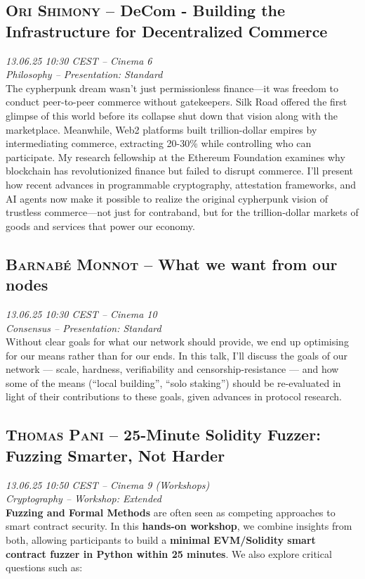 \subsection {\textsc{Ori Shimony}  -- DeCom - Building the Infrastructure for Decentralized Commerce} \noindent \textit {13.06.25 10:30 CEST -- Cinema 6\\ Philosophy -- Presentation: Standard}\\[1em] The cypherpunk dream wasn't just permissionless finance—it was freedom to conduct peer-to-peer commerce without gatekeepers. Silk Road offered the first glimpse of this world before its collapse shut down that vision along with the marketplace. Meanwhile, Web2 platforms built trillion-dollar empires by intermediating commerce, extracting 20-30\% while controlling who can participate. My research fellowship at the Ethereum Foundation examines why blockchain has revolutionized finance but failed to disrupt commerce. I'll present how recent advances in programmable cryptography, attestation frameworks, and AI agents now make it possible to realize the original cypherpunk vision of trustless commerce—not just for contraband, but for the trillion-dollar markets of goods and services that power our economy.

\clearpage
\subsection {\textsc{Barnabé Monnot}  -- What we want from our nodes} \noindent \textit {13.06.25 10:30 CEST -- Cinema 10\\ Consensus -- Presentation: Standard}\\[1em] Without clear goals for what our network should provide, we end up optimising for our means rather than for our ends. In this talk, I'll discuss the goals of our network — scale, hardness, verifiability and censorship-resistance — and how some of the means (``local building'', ``solo staking'') should be re-evaluated in light of their contributions to these goals, given advances in protocol research.

\clearpage
\subsection {\textsc{Thomas Pani}  -- 25-Minute Solidity Fuzzer: Fuzzing Smarter, Not Harder} \noindent \textit {13.06.25 10:50 CEST -- Cinema 9 (Workshops)\\ Cryptography -- Workshop: Extended}\\[1em] \textbf{Fuzzing and Formal Methods} are often seen as competing approaches to smart contract security. In this \textbf{hands-on workshop}, we combine insights from both, allowing participants to build a \textbf{minimal EVM/Solidity smart contract fuzzer in Python within 25 minutes}. We also explore critical questions such as:

